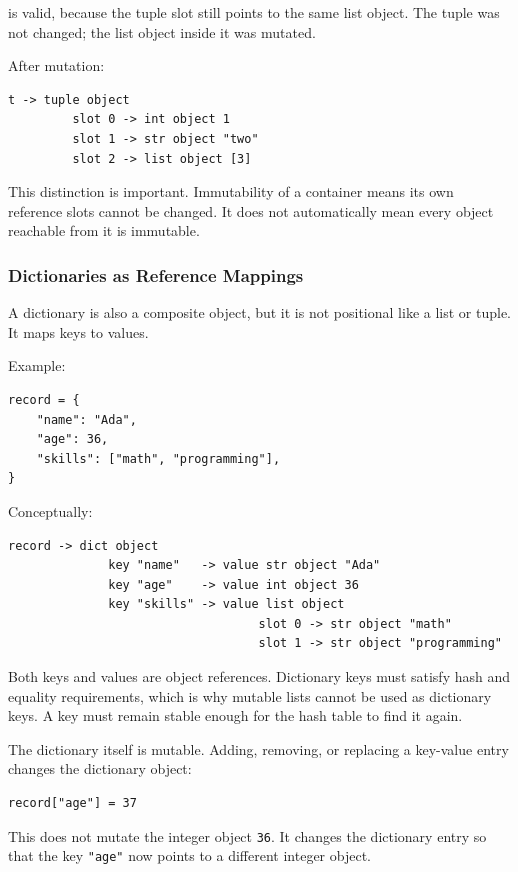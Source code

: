 is valid, because the tuple slot still points to the same list object. The tuple was not changed; the list object inside it was mutated.

After mutation:

\begin{verbatim}
t -> tuple object
         slot 0 -> int object 1
         slot 1 -> str object "two"
         slot 2 -> list object [3]
\end{verbatim}

This distinction is important. Immutability of a container means its own reference slots cannot be changed. It does not automatically mean every object reachable from it is immutable.

\subsubsection*{Dictionaries as Reference Mappings}

A dictionary is also a composite object, but it is not positional like a list or tuple. It maps keys to values.

Example:

\begin{verbatim}
record = {
    "name": "Ada",
    "age": 36,
    "skills": ["math", "programming"],
}
\end{verbatim}

Conceptually:

\begin{verbatim}
record -> dict object
              key "name"   -> value str object "Ada"
              key "age"    -> value int object 36
              key "skills" -> value list object
                                   slot 0 -> str object "math"
                                   slot 1 -> str object "programming"
\end{verbatim}

Both keys and values are object references. Dictionary keys must satisfy hash and equality requirements, which is why mutable lists cannot be used as dictionary keys. A key must remain stable enough for the hash table to find it again.

The dictionary itself is mutable. Adding, removing, or replacing a key-value entry changes the dictionary object:

\begin{verbatim}
record["age"] = 37
\end{verbatim}

This does not mutate the integer object \texttt{36}. It changes the dictionary entry so that the key \texttt{"age"} now points to a different integer object.

